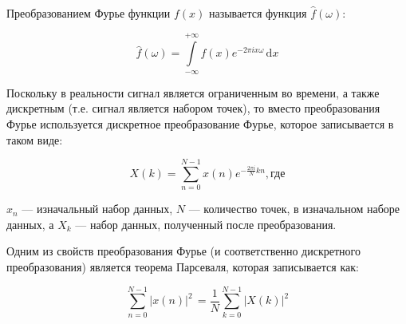 		

		
		Преобразованием Фурье функции $f(x)$ называется функция $\hat{f}(\omega)$:
		
		\begin{equation}
			\hat{f}(\omega) = \int\limits^{+\infty}_{-\infty} f(x) e^{-2 \pi i x \omega} \, \mathrm{d} x
		\end{equation}		 
		
		Поскольку в реальности сигнал является ограниченным во времени, а также дискретным (т.е. сигнал является набором точек), то вместо преобразования Фурье используется дискретное преобразование Фурье, которое записывается в таком виде:
		
		\begin{equation}
			X (k) = \sum^{N - 1}_{n = 0} x (n) e^{-\frac{2 \pi i}{N} k n}, \text{где}
		\end{equation}
		
		$x_n$ --- изначальный набор данных, $N$ ---	количество точек, в изначальном наборе данных, а $X_k$ --- набор данных, полученный после преобразования.
		
		Одним из свойств преобразования Фурье (и соответственно дискретного преобразования) является теорема Парсеваля, которая записывается как:
		 
		\begin{equation}
			\sum\limits^{N - 1}_{n = 0} |x (n)|^2 \, = \frac{1}{N} \sum\limits^{N - 1}_{k = 0} |X (k) |^2
		\end{equation}
		
